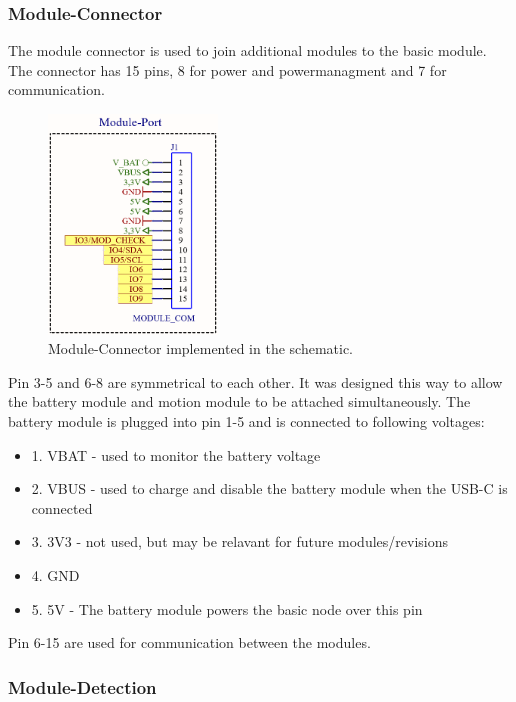     \subsubsection{Module-Connector}

        The module connector is used to join additional modules to the basic module.
        The connector has 15 pins, 8 for power and powermanagment and 7 for 
        communication. 

    \begin{figure}[H]
        \centering
        \includegraphics[width=0.4\textwidth]{assets/HW/Node-Module-Connector.png}
        \caption{Module-Connector implemented in the schematic.}
    \end{figure}

        Pin 3-5 and 6-8 are symmetrical to each other. It was designed this way
        to allow the battery module and motion module to be attached simultaneously.
        The battery module is plugged into pin 1-5 and is connected to following 
        voltages:
    
    \begin{itemize}
        \item 1. VBAT - used to monitor the battery voltage
        \item 2. VBUS - used to charge and disable the battery module when the USB-C 
        is connected
        \item 3. 3V3 - not used, but may be relavant for future modules/revisions
        \item 4. GND
        \item 5. 5V - The battery module powers the basic node over this pin
    \end{itemize}

        Pin 6-15 are used for communication between the modules. 


    \subsubsection{Module-Detection}
    
